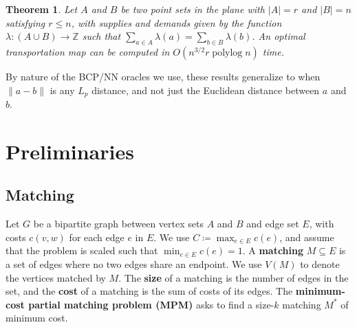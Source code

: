 \documentclass[11pt]{article}
\def\polylog{\mathop{\mathrm{polylog}}}
\def\ints{\mathbb{Z}}
\def\tsupply{\lambda}
\theoremstyle{plain}
\newtheorem{theorem}[lemma]{Theorem}
\numberwithin{figure}{section}
\def\EMPH#1{\textbf{\boldmath #1}}
\begin{document}
\begin{theorem}
\label{theorem:orlin}
Let $A$ and $B$ be two point sets in the plane with $|A| = r$ and $|B| = n$
satisfying $r \le n$, with supplies and demands given by the function
$\tsupply: (A \cup B) \to \ints$ such that
$\sum_{a \in A} \tsupply(a) = \sum_{b \in B} \tsupply(b)$.
An optimal transportation map can be computed in $O(n^{3/2}r\polylog n)$ time.
\end{theorem}



By nature of the BCP/NN oracles we use, these results generalize to when
$\|a - b\|$ is any $L_p$ distance, and not just the Euclidean distance between
$a$ and $b$.


\section{Preliminaries}
\label{section:prelim}

\subsection{Matching}

Let $G$ be a bipartite graph between vertex sets $A$ and $B$ and edge set $E$,
with costs $c(v, w)$ for each edge $e$ in $E$.
We use $C \coloneqq \max_{e \in E} c(e)$, and assume that the problem is scaled such
that $\min_{e \in E} c(e) = 1$.
A \EMPH{matching} $M \subseteq E$ is a set of edges where no two edges share an
endpoint.
We use $V(M)$ to denote the vertices matched by $M$.
The \EMPH{size} of a matching is the number of edges in the set, and the
\EMPH{cost} of a matching is the sum of costs of its edges.
The \EMPH{minimum-cost partial matching problem (MPM)} asks to find a size-$k$
matching $M^*$ of minimum cost.
\end{document}
